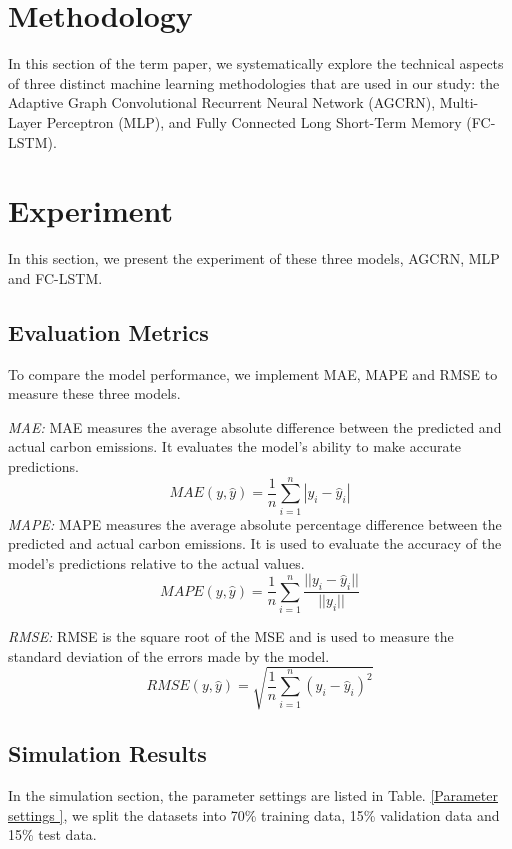 \documentclass[sigconf, authordraft]{acmart}
\begin{document}
\section{Methodology}

In this section of the term paper, we systematically explore the technical aspects of three distinct machine learning methodologies that are used in our study: the Adaptive Graph Convolutional Recurrent Neural Network (AGCRN), Multi-Layer Perceptron (MLP), and Fully Connected Long Short-Term Memory (FC-LSTM).



\section{Experiment}


In this section, we present the experiment of these three models, AGCRN, MLP and
FC-LSTM.

\subsection{Evaluation Metrics }
To compare the model performance, we implement MAE, MAPE and RMSE to measure these
three models.

\emph{MAE:} MAE measures the average absolute difference between the predicted
and actual carbon emissions. It evaluates the model's ability to make accurate
predictions.
\[
	MAE(y, \hat{y}) = \frac{1}{n}\sum_{i=1}^{n}|y_{i}- \hat{y}_{i}|
\]
\emph{MAPE:} MAPE measures the average absolute percentage difference between the
predicted and actual carbon emissions. It is used to evaluate the accuracy of
the model's predictions relative to the actual values.
\[
	MAPE(y, \hat{y}) = \frac{1}{n}\sum_{i=1}^{n}\frac{||y_{i}- \hat{y}_{i}||}{||y_{i}||}
\]

\emph{RMSE:} RMSE is the square root of the MSE and is used to measure the
standard deviation of the errors made by the model.
\[
	RMSE(y, \hat{y}) = \sqrt{\frac{1}{n}\sum_{i=1}^{n}(y_{i}- \hat{y}_{i})^{2}}
\]
\subsection{Simulation Results}
In the simulation section, the parameter settings are listed in Table. \ref{Parameter
	settings
}, we split the datasets into 70\% training data, 15\% validation data and 15\%
test data.
\end{document}
